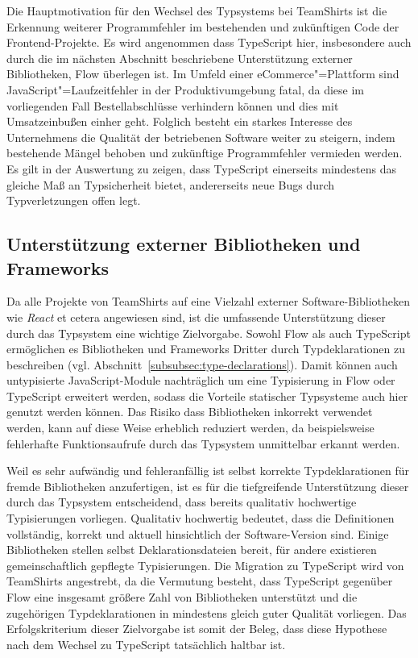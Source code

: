 Die Hauptmotivation für den Wechsel des Typsystems bei TeamShirts ist die Erkennung weiterer Programmfehler im bestehenden und zukünftigen Code der Frontend-Projekte. Es wird angenommen dass TypeScript hier, insbesondere auch durch die im nächsten Abschnitt beschriebene Unterstützung externer Bibliotheken, Flow überlegen ist. Im Umfeld einer eCommerce"=Plattform sind JavaScript"=Laufzeitfehler in der Produktivumgebung fatal, da diese im vorliegenden Fall Bestellabschlüsse verhindern können und dies mit Umsatzeinbußen einher geht. Folglich besteht ein starkes Interesse des Unternehmens die Qualität der betriebenen Software weiter zu steigern, indem bestehende Mängel behoben und zukünftige Programmfehler vermieden werden. Es gilt in der Auswertung zu zeigen, dass TypeScript einerseits mindestens das gleiche Maß an Typsicherheit bietet, andererseits neue Bugs durch Typverletzungen offen legt.

\subsection{Unterstützung externer Bibliotheken und Frameworks}

Da alle Projekte von TeamShirts auf eine Vielzahl externer Software-Bibliotheken wie \textit{React} et cetera angewiesen sind, ist die umfassende Unterstützung dieser durch das Typsystem eine wichtige Zielvorgabe. Sowohl Flow als auch TypeScript ermöglichen es Bibliotheken und Frameworks Dritter durch Typdeklarationen zu beschreiben (vgl. Abschnitt~\ref{subsubsec:type-declarations}). Damit können auch untypisierte JavaScript-Module nachträglich um eine Typisierung in Flow oder TypeScript erweitert werden, sodass die Vorteile statischer Typsysteme auch hier genutzt werden können. Das Risiko dass Bibliotheken inkorrekt verwendet werden, kann auf diese Weise erheblich reduziert werden, da beispielsweise fehlerhafte Funktionsaufrufe durch das Typsystem unmittelbar erkannt werden.

Weil es sehr aufwändig und fehleranfällig ist selbst korrekte Typdeklarationen für fremde Bibliotheken anzufertigen, ist es für die tiefgreifende Unterstützung dieser durch das Typsystem entscheidend, dass bereits qualitativ hochwertige Typisierungen vorliegen. Qualitativ hochwertig bedeutet, dass die Definitionen vollständig, korrekt und aktuell hinsichtlich der Software-Version sind. Einige Bibliotheken stellen selbst Deklarationsdateien bereit, für andere existieren gemeinschaftlich gepflegte Typisierungen. Die Migration zu TypeScript wird von TeamShirts angestrebt, da die Vermutung besteht, dass TypeScript gegenüber Flow eine insgesamt größere Zahl von Bibliotheken unterstützt und die zugehörigen Typdeklarationen in mindestens gleich guter Qualität vorliegen. Das Erfolgskriterium dieser Zielvorgabe ist somit der Beleg, dass diese Hypothese nach dem Wechsel zu TypeScript tatsächlich haltbar ist.

